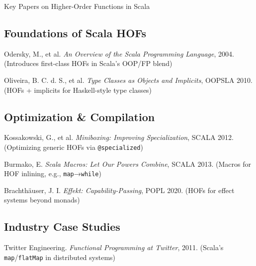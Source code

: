\documentclass{beamer}
\begin{document}

\begin{frame}[allowframebreaks]{Key Papers on Higher-Order Functions in Scala}
\footnotesize %
\begin{thebibliography}{6} %

\beamertemplatetextbibitems %

\subsection*{Foundations of Scala HOFs}
\color{darkblue}Odersky, M., et al.
\color{black}\textit{An Overview of the Scala Programming Language}, 2004.
\color{gray}\footnotesize (Introduces first-class HOFs in Scala's OOP/FP blend)

\color{darkblue}Oliveira, B. C. d. S., et al.
\color{black}\textit{Type Classes as Objects and Implicits}, OOPSLA 2010.
\color{gray}\footnotesize (HOFs + implicits for Haskell-style type classes)

\subsection*{Optimization \& Compilation}
\color{darkblue}Kossakowski, G., et al.
\color{black}\textit{Miniboxing: Improving Specialization}, SCALA 2012.
\color{gray}\footnotesize (Optimizing generic HOFs via \texttt{@specialized})

\color{darkblue}Burmako, E.
\color{black}\textit{Scala Macros: Let Our Powers Combine}, SCALA 2013.
\color{gray}\footnotesize (Macros for HOF inlining, e.g., \texttt{map}→\texttt{while})

\color{darkblue}Brachthäuser, J. I.
\color{black}\textit{Effekt: Capability-Passing}, POPL 2020.
\color{gray}\footnotesize (HOFs for effect systems beyond monads)

\subsection*{Industry Case Studies}
\color{darkblue}Twitter Engineering.
\color{black}\textit{Functional Programming at Twitter}, 2011.
\color{gray}\footnotesize (Scala's \texttt{map}/\texttt{flatMap} in distributed systems)

\end{thebibliography}
\end{frame}
\end{document}
